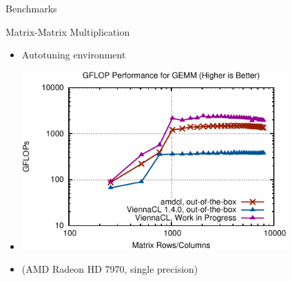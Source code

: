\begin{frame}{Benchmarks}

 \begin{block}{Matrix-Matrix Multiplication}
  \begin{itemize}
   \item Autotuning environment 
   \item \includegraphics[width=0.8\textwidth]{figures/gemm3.pdf}
   \item \centering (AMD Radeon HD 7970, single precision)
  \end{itemize}

 \end{block}

\end{frame}

